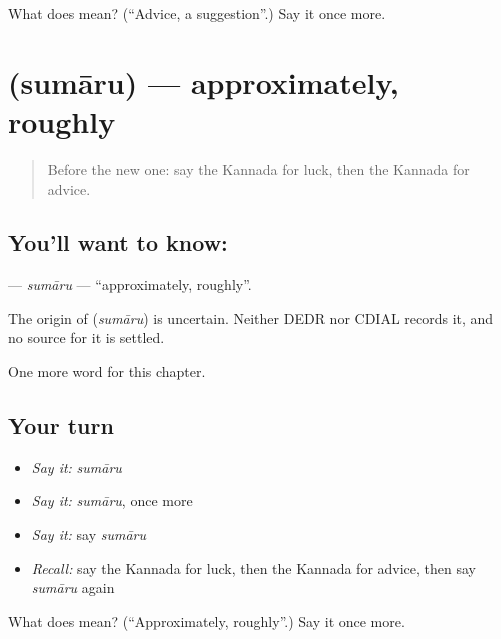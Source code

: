 \begin{tcolorbox}[breakable,colback=teal!4,colframe=teal!35!black,title={Before you move on}]
What does  mean? (\textquotedblleft{}Advice, a suggestion\textquotedblright{}.) Say it once more.
\end{tcolorbox}
\section[\texorpdfstring{\kn{ಸುಮಾರು} (sumāru)}{ಸುಮಾರು (sumāru)}]{ (sumāru) — approximately, roughly}

\label{lesson:KA-C252-sumaru}



\begin{quote}
Before the new one: say the Kannada for luck, then the Kannada for advice.
\end{quote}

\subsection*{You'll want to know: }
\textbf{} — \emph{sumāru} — \textquotedblleft{}approximately, roughly\textquotedblright{}.

\begin{cousinweb}
The origin of \textbf{} (\emph{sumāru}) is uncertain. Neither DEDR nor CDIAL records it, and no source for it is settled.
\end{cousinweb}

\begin{grammarlens}[title={What you've built}]
One more word for this chapter.
\end{grammarlens}

\subsection*{Your turn}
\begin{itemize}
\raggedright
  \item \emph{Say it:} \emph{sumāru}
  \item \emph{Say it:} \emph{sumāru}, once more
  \item \emph{Say it:} say \emph{sumāru}
  \item \emph{Recall:} say the Kannada for luck, then the Kannada for advice, then say \emph{sumāru} again
\end{itemize}

\begin{tcolorbox}[breakable,colback=teal!4,colframe=teal!35!black,title={Before you move on}]
What does  mean? (\textquotedblleft{}Approximately, roughly\textquotedblright{}.) Say it once more.
\end{tcolorbox}
